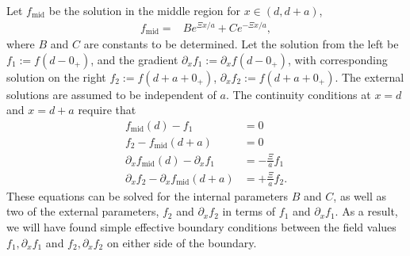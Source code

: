 Let $f_{\text{mid}}$ be the solution in the middle region for $x\in(d,d+a)$,   
    \begin{align}
      f_{\text{mid}} %
      =& Be^{\Xi x/a} + C e^{-\Xi x/a},
    \end{align}
    where $B$ and $C$ are constants to be determined.
    Let the solution from the left be $f_1:=f(d-0_+)$, and the gradient $\partial_x f_1:=\partial_x f(d-0_+)$,
    with corresponding solution on the right $f_2:=f(d+a+0_+)$, $\partial_x f_2:=f(d+a+0_+)$.  The
    external solutions are assumed to be independent of $a$.  
    The continuity conditions at $x=d$ and $x=d+a$ require that
    \begin{subequations}
      \begin{align}
        f_{\text{mid}}(d)-f_1 &= 0 \label{eq:f1}\\
        f_2- f_{\text{mid}}(d+a)&= 0 \label{eq:f2}\\
        \partial_xf_{\text{mid}}(d) -\partial_xf_1&= -\frac{\Xi}{a} f_1\label{eq:f1'}\\
        \partial_x f_2 -\partial_x f_{\text{mid}}(d+a)&= +\frac{\Xi}{a} f_2.\label{eq:f2'}
      \end{align}
    \end{subequations}
   These equations can be solved for the internal parameters $B$ and $C$, as well as two of the external 
   parameters, $f_2$ and $\partial_x f_2$ in terms of $f_1$ and $\partial_x f_1$.
   As a result, we will have found simple effective boundary conditions between
   the field values $f_1,\partial_xf_1$ and $f_2,\partial_xf_2$ on either side of the boundary.

